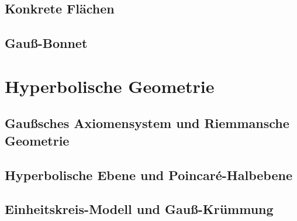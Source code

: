 \documentclass{article}
\theoremstyle{definition} %
\begin{document}
\subsection{Konkrete Flächen}

\newpage
\subsection{Gauß-Bonnet}


\clearpage
\section{Hyperbolische Geometrie}
\subsection{Gaußsches Axiomensystem und Riemmansche Geometrie}

\newpage
\subsection{Hyperbolische Ebene und Poincaré-Halbebene}

\newpage
\subsection{Einheitskreis-Modell und Gauß-Krümmung}

\end{document}
